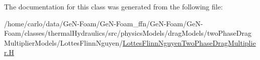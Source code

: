 The documentation for this class was generated from the following file\+:\begin{DoxyCompactItemize}
\item 
/home/carlo/data/\+Ge\+N-\/\+Foam/\+Ge\+N-\/\+Foam\+\_\+ffn/\+Ge\+N-\/\+Foam/\+Ge\+N-\/\+Foam/classes/thermal\+Hydraulics/src/physics\+Models/drag\+Models/two\+Phase\+Drag\+Multiplier\+Models/\+Lottes\+Flinn\+Nguyen/\hyperlink{LottesFlinnNguyenTwoPhaseDragMultiplier_8H}{Lottes\+Flinn\+Nguyen\+Two\+Phase\+Drag\+Multiplier.\+H}\end{DoxyCompactItemize}
